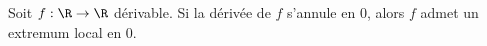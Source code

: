 Soit $f : \R \to \R$ dérivable. \newline Si la dérivée de $f$ s'annule en $0$, alors $f$ admet un extremum local en $0$.

\begin{reponses}
\end{reponses}

